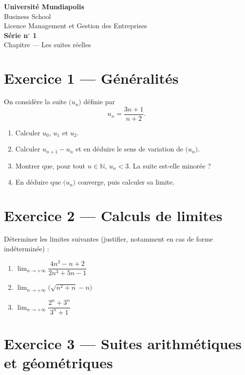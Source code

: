 \documentclass[11pt,a4paper]{article}
\begin{document}
\begin{center}
{\LARGE\bfseries\color{mundiblue} Université Mundiapolis}\\[0.25cm]
{\large\color{mundigray} Business School}\\[0.15cm]
{\large Licence Management et Gestion des Entreprises}\\[0.45cm]
{\Large\bfseries\color{mundidark} Série n$^{\circ}$ 1}\\[0.2cm]
{\large Chapitre --- Les suites réelles}
\end{center}

\vspace{0.4cm}

\section*{Exercice 1 --- Généralités}

On considère la suite $\bigl(u_n\bigr)$ définie par
\[
u_n = \dfrac{3n+1}{n+2}.
\]

\begin{enumerate}
  \item Calculer $u_0$, $u_1$ et $u_2$.
  \item Calculer $u_{n+1}-u_n$ et en déduire le sens de variation de $\bigl(u_n\bigr)$.
  \item Montrer que, pour tout $n\in\mathbb{N}$, $u_n < 3$. La suite est-elle minorée ?
  \item En déduire que $\bigl(u_n\bigr)$ converge, puis calculer sa limite.
\end{enumerate}

\section*{Exercice 2 --- Calculs de limites}

Déterminer les limites suivantes (justifier, notamment en cas de forme indéterminée) :

\begin{enumerate}
  \item $\displaystyle\lim_{n\to +\infty} \dfrac{4n^3 - n + 2}{2n^3 + 5n - 1}$
  \item $\displaystyle\lim_{n\to +\infty} \bigl(\sqrt{n^2 + n} - n\bigr)$
  \item $\displaystyle\lim_{n\to +\infty} \dfrac{2^n + 3^n}{3^n + 1}$
\end{enumerate}

\section*{Exercice 3 --- Suites arithmétiques et géométriques}
\end{document}
